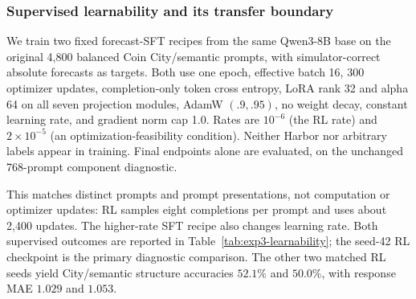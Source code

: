 \begin{table}[htbp]
\centering\small

\caption{\textbf{Post hoc Qwen3-32B audit of incorrectly offset answers.}
The first three numeric columns are unclipped response MAE. Exact means all
eight relative response coordinates are within $.01$ of truth; Omit rest means
both zero-shock predictions are near zero. These last two columns concern the
selected-pattern interface only. They do not measure correct absolute forecasts.}
\label{tab:exp3-baseline-audit}
\end{table}

\subsubsection{Supervised learnability and its transfer boundary}
\label{app:exp3-learnability}

We train two fixed forecast-SFT recipes from the same Qwen3-8B base on the
original 4,800 balanced Coin City/semantic prompts, with simulator-correct
absolute forecasts as targets. Both use one epoch, effective batch 16,
300 optimizer updates, completion-only token cross entropy, LoRA rank 32 and
alpha 64 on all seven projection modules, AdamW $(.9,.95)$, no weight decay,
constant learning rate, and gradient norm cap 1.0. Rates are $10^{-6}$ (the RL
rate) and $2\times10^{-5}$ (an optimization-feasibility condition). Neither
Harbor nor arbitrary labels appear in training. Final endpoints alone are
evaluated, on the unchanged 768-prompt component diagnostic.

This matches distinct prompts and prompt presentations, not computation or
optimizer updates: RL samples eight completions per prompt and uses about
2,400 updates. The higher-rate SFT recipe also changes learning rate. Both
supervised outcomes are reported in Table~\ref{tab:exp3-learnability}; the
seed-42 RL checkpoint is the primary diagnostic comparison. The other two
matched RL seeds yield City/semantic structure accuracies $52.1\%$ and
$50.0\%$, with response MAE $1.029$ and $1.053$.

\begin{table}[htbp]
\centering\small
\setlength{\tabcolsep}{4pt}

\caption{\textbf{A supervised recipe learns in-domain structure selection but
fails to transfer.} All trained recipes in this table use seed 42; the
successful recipe's three seed replications are in
Table~\ref{tab:exp3-learnability-seeds}. Structure accuracy
is derived from forecasts, not reference naming. All outputs parse. Intervals
resample the 24 paired episodes within each cell (2,000 draws); they do not
capture training-seed uncertainty. Both fixed SFT learning rates are retained.}
\label{tab:exp3-learnability}
\end{table}

